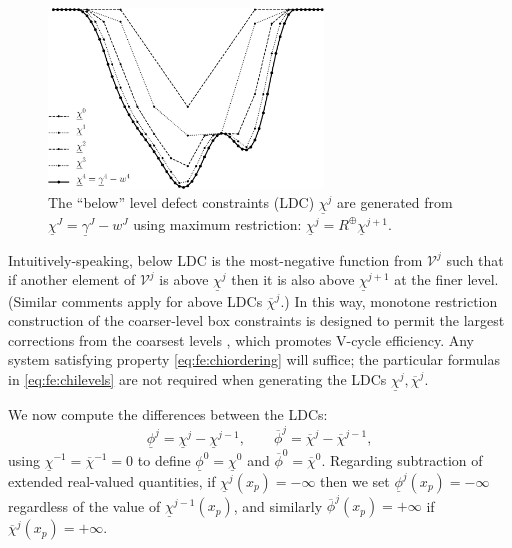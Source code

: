\documentclass[letterpaper,final,12pt,reqno]{amsart}
\theoremstyle{cstyle}
\theoremstyle{cstyle*}
\theoremstyle{dstyle}
\numberwithin{equation}{section}
\numberwithin{figure}{section}
\numberwithin{table}{section}
\numberwithin{theorem}{section}
\newcommand{\maxR}{R^{\bm{\oplus}}}
\begin{document}
\begin{figure}[ht]
\includegraphics[width=0.65\textwidth]{fixfigs/chiphilevels.pdf}
\caption{The ``below'' level defect constraints (LDC) $\underline{\chi}^j$ are generated from $\underline{\chi}^J = \underline{\gamma}^J - w^J$ using maximum restriction: $\underline{\chi}^j = \maxR \underline{\chi}^{j+1}$.}
\label{fig:chiphilevels}
\end{figure}

Intuitively-speaking, below LDC is the most-negative function from $\mathcal{V}^j$ such that if another element of $\mathcal{V}^j$ is above $\underline{\chi}^j$ then it is also above $\underline{\chi}^{j+1}$ at the finer level.  (Similar comments apply for above LDCs $\overline{\chi}^{j}$.)  In this way, monotone restriction construction of the coarser-level box constraints is designed to permit the largest corrections from the coarsest levels \cite{GraeserKornhuber2009}, which promotes V-cycle efficiency.  Any system satisfying property \eqref{eq:fe:chiordering} will suffice; the particular formulas in \eqref{eq:fe:chilevels} are not required when generating the LDCs $\underline{\chi}^{j},\overline{\chi}^{j}$.

We now compute the differences between the LDCs:
\begin{equation}
\underline{\phi}^j = \underline{\chi}^j - \underline{\chi}^{j-1}, \qquad \overline{\phi}^j = \overline{\chi}^j - \overline{\chi}^{j-1},  \label{eq:fe:philevels}
\end{equation}
using $\underline{\chi}^{-1}=\overline{\chi}^{-1}=0$ to define $\underline{\phi}^0=\underline{\chi}^0$ and $\overline{\phi}^0=\overline{\chi}^0$.  Regarding subtraction of extended real-valued quantities, if $\underline{\chi}^j(x_p)=-\infty$ then we set $\underline{\phi}^j(x_p)=-\infty$ regardless of the value of $\underline{\chi}^{j-1}(x_p)$, and similarly $\overline{\phi}^j(x_p)=+\infty$ if $\overline{\chi}^j(x_p)=+\infty$.
\end{document}
